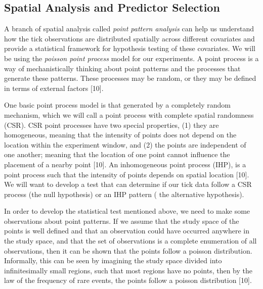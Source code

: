 \subsection{Spatial Analysis and Predictor Selection}
\noindent A branch of spatial analysis called \textit{point pattern analysis} can help us understand how the tick observations are distributed spatially across different covariates and provide a statistical framework for hypothesis testing of these covariates. We will be using the \textit{poisson point process} model for our experiments. A point process is a way of mechanistically thinking about point patterns and the processes that generate these patterns. These processes may be random, or they may be defined in terms of external factors [10]. \newline

\noindent One basic point process model is that generated by a completely random mechanism, which we will call a point process with complete spatial randomness (CSR). CSR point processes have two special properties, (1) they are homogeneous, meaning that the intensity of points does not depend on the location within the experiment window, and (2) the points are independent of one another; meaning that the location of one point cannot influence the placement of a nearby point [10]. An inhomogeneous point process (IHP), is a point process such that the intensity of points depends on spatial location [10]. We will want to develop a test that can determine if our tick data follow a CSR process (the null hypothesis) or an IHP pattern ( the alternative hypothesis). \newline 

\noindent In order to develop the statistical test mentioned above, we need to make some observations about point patterns. If we assume that the study space of the points is well defined and that an observation could have occurred anywhere in the study space, and that the set of observations is a complete enumeration of all observations, then it can be shown that the points follow a poisson distribution. Informally, this can be seen by imagining the study space divided into infinitesimally small regions, such that most regions have no points, then by the law of the frequency of rare events, the points follow a poisson distribution [10].  \newline

